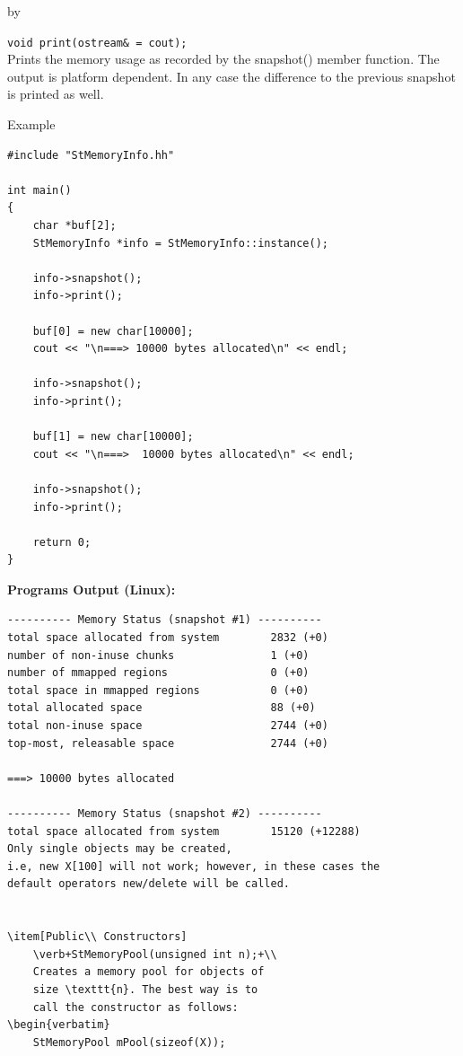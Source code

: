 \documentclass[twoside]{article}
\newcommand{\entrylabel}[1]{\mbox{\textbf{{#1}}}\hfil}%
\newenvironment{entry}
{\begin{list}{}%
    {\renewcommand{\makelabel}{\entrylabel}%
     \setlength{\labelwidth}{90pt}%
     \setlength{\leftmargin}{\labelwidth}
     \advance\leftmargin by \labelsep%
      }%
    }%
  {\end{list}}
\newcommand{\Entrylabel}[1]%
{\raisebox{0pt}[1ex][0pt]{\makebox[\labelwidth][l]%
    {\parbox[t]{\labelwidth}{\hspace{0pt}\textbf{{#1}}}}}}
\newenvironment{Entry}%
{\renewcommand{\entrylabel}{\Entrylabel}\begin{entry}}%
  {\end{entry}}
\begin{document}
\begin{description}
\begin{Entry}
    \verb+void print(ostream& = cout);+\\
    Prints the memory usage as recorded by the snapshot()
    member function. The output is platform dependent. In any
    case the difference to the previous snapshot is printed
    as well.
    
\item[Example]
{\footnotesize
\begin{verbatim}
#include "StMemoryInfo.hh"

int main()
{
    char *buf[2];
    StMemoryInfo *info = StMemoryInfo::instance();
    
    info->snapshot();
    info->print();

    buf[0] = new char[10000];
    cout << "\n===> 10000 bytes allocated\n" << endl;

    info->snapshot();
    info->print();

    buf[1] = new char[10000];
    cout << "\n===>  10000 bytes allocated\n" << endl;

    info->snapshot();
    info->print();

    return 0;
}
\end{verbatim}
}%
{\bf Programs Output (Linux):}
{\footnotesize
\begin{verbatim}
---------- Memory Status (snapshot #1) ----------
total space allocated from system        2832 (+0) 
number of non-inuse chunks               1 (+0) 
number of mmapped regions                0 (+0) 
total space in mmapped regions           0 (+0) 
total allocated space                    88 (+0) 
total non-inuse space                    2744 (+0) 
top-most, releasable space               2744 (+0) 

===> 10000 bytes allocated

---------- Memory Status (snapshot #2) ----------
total space allocated from system        15120 (+12288) 
Only single objects may be created,
i.e, new X[100] will not work; however, in these cases the
default operators new/delete will be called.


\item[Public\\ Constructors]
    \verb+StMemoryPool(unsigned int n);+\\
    Creates a memory pool for objects of
    size \texttt{n}. The best way is to
    call the constructor as follows:
\begin{verbatim}
    StMemoryPool mPool(sizeof(X));
\end{verbatim}
    
}
\end{Entry}
\end{description}
\end{document}
